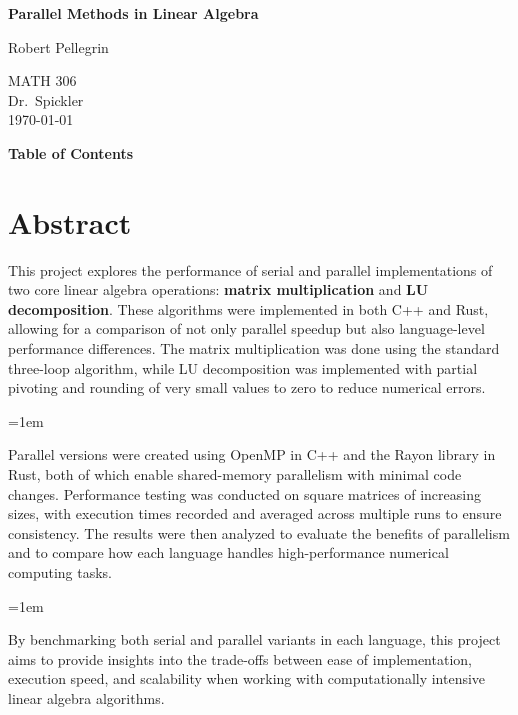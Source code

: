 \documentclass[12pt]{article}
\begin{document}
\begin{titlepage}
    \centering
    \vspace*{2in}
    {\Huge\bfseries Parallel Methods in Linear Algebra\par}
    \vspace{1in}
    {\Large Robert Pellegrin\par}
    \vspace{0.5in}
    {\large MATH 306\\ Dr.\ Spickler \\ \today\par}
    \vfill
\end{titlepage}

\newpage
\thispagestyle{empty}
\vspace*{2cm}
\begin{center}
    {\LARGE \bfseries Table of Contents}
\end{center}
\vspace{1.5cm}
\tableofcontents
\newpage


\newpage
\section*{Abstract}
This project explores the performance of serial and parallel implementations of two core linear algebra operations: \textbf{matrix multiplication}
and \textbf{LU decomposition}. These algorithms were implemented in both C++ and Rust, allowing for a comparison of not only parallel speedup but
also language-level performance differences. The matrix multiplication was done using the standard three-loop algorithm, while LU decomposition
was implemented with partial pivoting and rounding of very small values to zero to reduce numerical errors.

\parskip=1em

Parallel versions were created using OpenMP in C++ and the Rayon library in Rust, both of which enable shared-memory parallelism with minimal
code changes. Performance testing was conducted on square matrices of increasing sizes, with execution times recorded and averaged across
multiple runs to ensure consistency. The results were then analyzed to evaluate the benefits of parallelism and to compare how each language
handles high-performance numerical computing tasks.

\parskip=1em

By benchmarking both serial and parallel variants in each language, this project aims to provide insights into the trade-offs between ease of
implementation, execution speed, and scalability when working with computationally intensive linear algebra algorithms.
\end{document}
